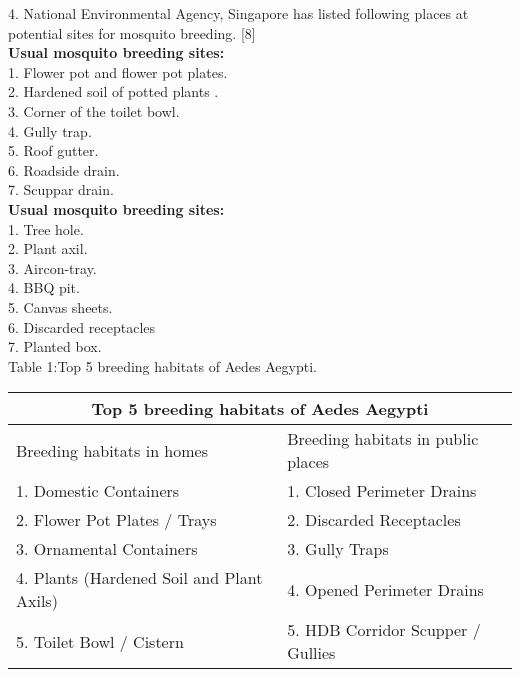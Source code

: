 \documentclass[11pt]{exam}
\begin{document}
\begin{questions}
4. National Environmental Agency, Singapore has listed following places at potential sites for mosquito breeding. [8]\\
  \textbf{Usual mosquito breeding sites:\\ }             
  1. Flower pot and flower pot plates. \\     
  2. Hardened soil of potted plants .\\       
  3. Corner of the toilet bowl. \\
  4. Gully trap. \\
  5. Roof gutter. \\
  6. Roadside drain. \\
  7. Scuppar drain. \\ 
    
  \textbf{Usual mosquito breeding sites:\\} 
  1. Tree hole. \\
  2. Plant axil. \\
  3. Aircon-tray. \\
  4. BBQ pit. \\
  5. Canvas sheets. \\
  6. Discarded receptacles \\
  7. Planted box. \\

Table 1:Top 5 breeding habitats of Aedes Aegypti. \\

\begin{tabular}{ |p{7cm}|p{7cm}| }
\hline
\multicolumn{2}{|c|}{\textbf{Top 5 breeding habitats of Aedes Aegypti}} \\
\hline
Breeding habitats in homes & Breeding habitats in public places   \\
\hline
1. Domestic Containers & 1. Closed Perimeter Drains\\
2. Flower Pot Plates / Trays & 2. Discarded Receptacles\\
3. Ornamental Containers & 3. Gully Traps \\
4. Plants (Hardened Soil and Plant Axils) & 4. Opened Perimeter Drains\\
5. Toilet Bowl / Cistern & 5. HDB Corridor Scupper / Gullies \\
\hline
\end{tabular} \\ \\



\end{questions}
\end{document}
